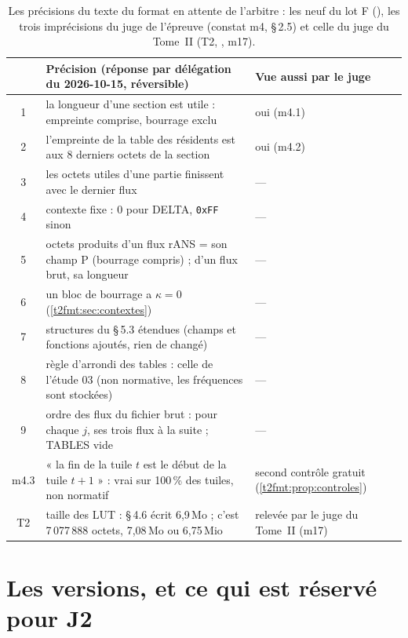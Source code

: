 \begin{table}[ht]
\centering\small
\begin{tabularx}{\linewidth}{c >{\raggedright\arraybackslash}X >{\raggedright\arraybackslash}X}
\toprule
& Précision (réponse par délégation du 2026-10-15, réversible) & Vue aussi par le juge \\
\midrule
1 & la longueur d'une section est utile : empreinte comprise, bourrage exclu & oui (m4.1) \\
2 & l'empreinte de la table des résidents est aux 8 derniers octets de la section & oui (m4.2) \\
3 & les octets utiles d'une partie finissent avec le dernier flux & — \\
4 & contexte fixe : 0 pour DELTA, \texttt{0xFF} sinon & — \\
5 & octets produits d'un flux rANS = son champ P (bourrage compris) ; d'un flux brut, sa longueur & — \\
6 & un bloc de bourrage a $\kappa = 0$ (\cref{t2fmt:sec:contextes}) & — \\
7 & structures du §\,5.3 étendues (champs et fonctions ajoutés, rien de changé) & — \\
8 & règle d'arrondi des tables : celle de l'étude 03 (non normative, les fréquences sont stockées) & — \\
9 & ordre des flux du fichier brut : pour chaque $j$, ses trois flux à la suite ; TABLES vide & — \\
m4.3 & « la fin de la tuile $t$ est le début de la tuile $t+1$ » : vrai sur 100\,\% des tuiles, non normatif & second contrôle gratuit (\cref{t2fmt:prop:controles}) \\
T2 & taille des LUT : §\,4.6 écrit 6,9\,Mo ; c'est 7\,077\,888 octets, 7,08\,Mo ou 6,75\,Mio & relevée par le juge du Tome~II (m17) \\
\bottomrule
\end{tabularx}
\caption[Les précisions du texte en attente de l'arbitre]{Les précisions du texte du format en attente de l'arbitre : les neuf du lot F (), les trois imprécisions du juge de l'épreuve (constat m4,  §\,2.5) et celle du juge du Tome~II (T2, , m17).}
\label{t2fmt:tab:precisions}
\end{table}

\section{Les versions, et ce qui est réservé pour J2}\label{t2fmt:sec:versions}

